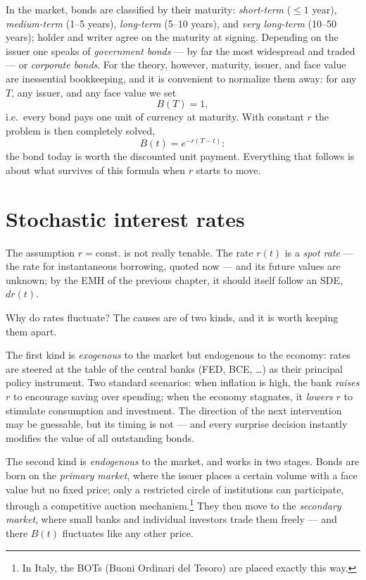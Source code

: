 In the market, bonds are classified by their maturity: \emph{short-term} ($\le 1$ year), \emph{medium-term} (1--5 years), \emph{long-term} (5--10 years), and \emph{very long-term} (10--50 years); holder and writer agree on the maturity at signing.
Depending on the issuer one speaks of \emph{government bonds} --- by far the most widespread and traded --- or \emph{corporate bonds}.
For the theory, however, maturity, issuer, and face value are inessential bookkeeping, and it is convenient to normalize them away: for any $T$, any issuer, and any face value we set
\begin{equation}
B(T)=1,
\end{equation}
i.e.\ every bond pays one unit of currency at maturity.
With constant $r$ the problem is then completely solved,
\begin{equation}
B(t) = e^{-r(T-t)}:
\end{equation}
the bond today is worth the discounted unit payment.
Everything that follows is about what survives of this formula when $r$ starts to move.


\section{Stochastic interest rates}\label{sec:stochastic-rates}

The assumption $r = \text{const.}$ is not really tenable.
The rate $r(t)$ is a \emph{spot rate} --- the rate for instantaneous borrowing, quoted now --- and its future values are unknown; by the EMH of the previous chapter, it should itself follow an SDE, $dr(t)$.

Why do rates fluctuate?
The causes are of two kinds, and it is worth keeping them apart.

The first kind is \emph{exogenous} to the market but endogenous to the economy: rates are steered at the table of the central banks (FED, BCE, \ldots) as their principal policy instrument.
Two standard scenarios: when inflation is high, the bank \emph{raises} $r$ to encourage saving over spending; when the economy stagnates, it \emph{lowers} $r$ to stimulate consumption and investment.
The direction of the next intervention may be guessable, but its timing is not --- and every surprise decision instantly modifies the value of all outstanding bonds.

The second kind is \emph{endogenous} to the market, and works in two stages.
Bonds are born on the \emph{primary market}, where the issuer places a certain volume with a face value but no fixed price; only a restricted circle of institutions can participate, through a competitive auction mechanism.\footnote{In Italy, the BOTs (Buoni Ordinari del Tesoro) are placed exactly this way.}
They then move to the \emph{secondary market}, where small banks and individual investors trade them freely --- and there $B(t)$ fluctuates like any other price.

